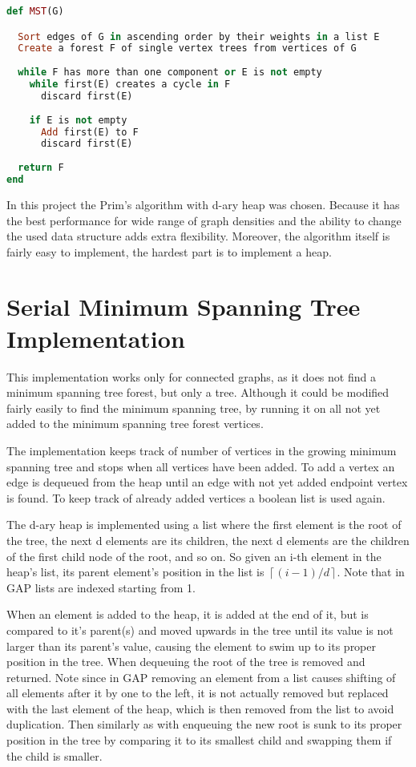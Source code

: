 \documentclass{report}
\theoremstyle{plain}
\theoremstyle{definition}
\theoremstyle{remark}
\begin{document}
\begin{lstlisting}[language=Ruby]
def MST(G)

  Sort edges of G in ascending order by their weights in a list E
  Create a forest F of single vertex trees from vertices of G
  
  while F has more than one component or E is not empty
    while first(E) creates a cycle in F
      discard first(E)
      
    if E is not empty
      Add first(E) to F
      discard first(E)      
  
  return F
end
\end{lstlisting}

In this project the Prim's algorithm with d-ary heap was chosen. Because it has the best performance for wide range of graph densities and 
the ability to change the used data structure adds extra flexibility. Moreover, the algorithm itself is fairly easy to implement, the hardest part is to implement a heap.

\section{Serial Minimum Spanning Tree Implementation}

This implementation works only for connected graphs, as it does not find a minimum spanning tree forest, but only a tree. Although it could be modified fairly easily to find the minimum spanning tree, by running it on all not yet added to the minimum spanning tree forest vertices.

The implementation keeps track of number of vertices in the growing minimum spanning tree and stops when all vertices have been added. To add a vertex an edge is dequeued from the heap until an edge with not yet added endpoint vertex is found. To keep track of already added vertices a boolean list is used again.

The d-ary heap is implemented using a list where the first element is the root of the tree, the next d elements are its children, the next d elements are the children of the first child node of the root, and so on. So given an i-th element in the heap's list, its parent element's position in the list is $\left\lceil(i-1)/d\right\rceil$. Note that in GAP lists are indexed starting from 1. 

When an element is added to the heap, it is added at the end of it, but is compared to it's parent(s) and moved upwards in the tree until its value is not larger than its parent's value, causing the element to swim up to its proper position in the tree. When dequeuing the root of the tree is removed and returned. Note since in GAP removing an element from a list causes shifting of all elements after it by one to the left, it is not actually removed but replaced with the last element of the heap, which is then removed from the list to avoid duplication. Then similarly as with enqueuing the new root is sunk to its proper position in the tree by comparing it to its smallest child and swapping them if the child is smaller.
\end{document}
